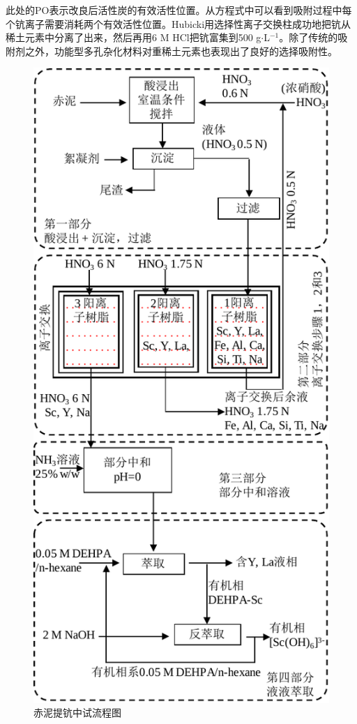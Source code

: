 此处的PO表示改良后活性炭的有效活性位置。从方程式中可以看到吸附过程中每个钪离子需要消耗两个有效活性位置。Hubicki\cite{hubicki1990studies}用选择性离子交换柱成功地把钪从稀土元素中分离了出来，然后再用6 M HCl把钪富集到500 g$ \cdot $L$ ^{\mathrm{-1}} $。除了传统的吸附剂之外，功能型多孔杂化材料对重稀土元素也表现出了良好的选择吸附性\cite{florek2014nanostructured}。
\begin{figure}[!h]
	\centering
	\includegraphics[width=0.65\linewidth]{Figures/c1/Figure12}%
	\caption{赤泥提钪中试流程图}\label{recoveringSc-middlescale}
\end{figure}

